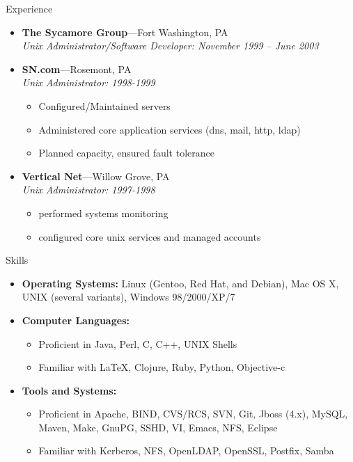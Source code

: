 \documentclass[11pt,oneside]{article}
\newenvironment{ressection}[1]{
	\vspace{4pt}
	{\fontfamily{phv}\selectfont\Large#1}
	\begin{itemize}
	\vspace{3pt}
}{
	\end{itemize}
}
\newcommand{\resitem}[1]{
	\vspace{-4pt}
	\item \begin{flushleft} #1 \end{flushleft}
}
\newcommand{\ressubitem}[1]{
	\vspace{-1pt}
	\item \begin{flushleft} #1 \end{flushleft}
}
\newcommand{\resbigitem}[3]{
	\vspace{-5pt}
	\item
	\textbf{#1}---#2 \\
	\textit{#3}
}
\newenvironment{ressubsec}[3]{
	\resbigitem{#1}{#2}{#3}
	\vspace{-2pt}
	\begin{itemize}
}{
	\end{itemize}
}
\newenvironment{reslist}[1]{
	\resitem{\textbf{#1}}
	\vspace{-5pt}
	\begin{itemize}
}{
	\end{itemize}
}
\begin{document}
\begin{ressection}{Experience}
\begin{ressubsec}{The Sycamore Group}{Fort Washington, PA}{Unix Administrator/Software Developer: November 1999 -- June 2003}
        \end{ressubsec}

	\begin{ressubsec}{SN.com}{Rosemont, PA}{Unix Administrator: 1998-1999}

	  \ressubitem{Configured/Maintained servers}

	  \ressubitem{Administered core application services (dns, mail, http, ldap)}

	  \ressubitem{Planned capacity, ensured fault tolerance}

	\end{ressubsec}

	\begin{ressubsec}{Vertical Net}{Willow Grove, PA}{Unix Administrator: 1997-1998}

	  \ressubitem{performed systems monitoring}

	  \ressubitem{configured core unix services and managed accounts}

	\end{ressubsec}

\end{ressection}


\begin{ressection}{Skills}
  
  \resitem{\textbf{Operating Systems:} Linux (Gentoo, Red Hat, and
    Debian), Mac OS X, UNIX (several variants), Windows 98/2000/XP/7}
  
  \begin{reslist}{Computer Languages:}
    
    \ressubitem{Proficient in Java, Perl, C, C++,  UNIX Shells}
    
    \ressubitem{Familiar with \LaTeX, Clojure, Ruby, Python, Objective-c}
    
  \end{reslist}

  \begin{reslist}{Tools and Systems:}
    
    \ressubitem{Proficient in Apache, BIND, CVS/RCS, SVN, Git, Jboss
      (4.x), MySQL, Maven, Make, GnuPG, SSHD, VI, Emacs, NFS, Eclipse}
    
    \ressubitem{Familiar with Kerberos, NFS, OpenLDAP, OpenSSL, Postfix, Samba}
    
  \end{reslist}
  
  
\end{ressection}
\end{document}
